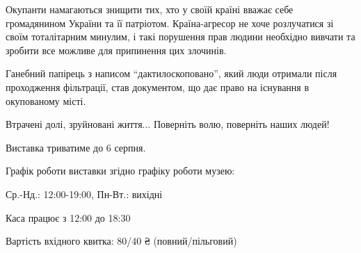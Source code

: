 Окупанти намагаються знищити тих, хто у своїй країні вважає себе громадянином
України та її патріотом. Країна-агресор не хоче розлучатися зі своїм
тоталітарним минулим, і такі порушення  прав людини необхідно вивчати та
зробити все можливе для припинення цих злочинів.

Ганебний папірець з написом \enquote{дактилоскоповано}, який люди отримали після
проходження фільтрації, став документом, що дає право на існування в
окупованому місті. 

Втрачені долі, зруйновані життя... Поверніть волю, поверніть наших людей!

Виставка триватиме до 6 серпня.

Графік роботи виставки згідно графіку роботи музею: 

Ср.-Нд.: 12:00-19:00, Пн-Вт.: вихідні

Каса працює з 12:00 до 18:30

Вартість вхідного квитка: 80/40 ₴ (повний/пільговий)
